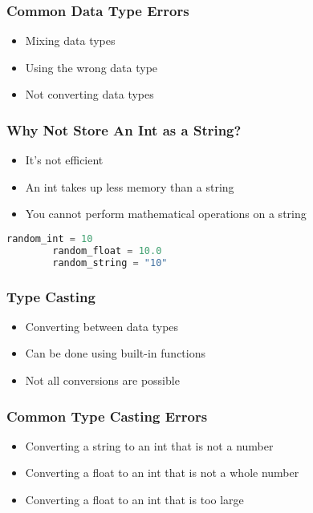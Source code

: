 \documentclass[serif, 9pt, aspectratio=32]{beamer}
\begin{document}
\begin{frame}
    \centering
    \frametitle{Common Data Type Errors}
    \begin{itemize}
        \setlength{\itemsep}{3em}
        \item Mixing data types
        \item Using the wrong data type
        \item Not converting data types
    \end{itemize}
\end{frame}

\begin{frame}
    \centering
    \frametitle{Why Not Store An Int as a String?}
    \begin{itemize}
        \setlength{\itemsep}{3em}
        \item It's not efficient
        \item An int takes up less memory than a string
        \item You cannot perform mathematical operations on a string
    \end{itemize}
\end{frame}

\begin{frame}[fragile]
    \begin{lstlisting}[language=Python]
        random_int = 10
        random_float = 10.0
        random_string = "10"
    \end{lstlisting}
\end{frame}

\begin{frame}
    \centering
    \frametitle{Type Casting}
    \begin{itemize}
        \setlength{\itemsep}{3em}
        \item Converting between data types
        \item Can be done using built-in functions
        \item Not all conversions are possible
    \end{itemize}
\end{frame}

\begin{frame}
    \centering
    \frametitle{Common Type Casting Errors}
    \begin{itemize}
        \setlength{\itemsep}{3em}
        \item Converting a string to an int that is not a number
        \item Converting a float to an int that is not a whole number
        \item Converting a float to an int that is too large
    \end{itemize}
\end{frame}
\end{document}
